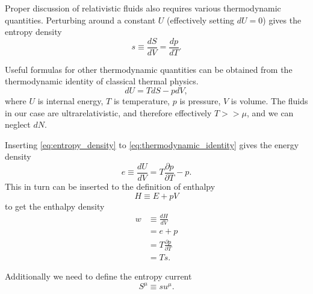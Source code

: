 Proper discussion of relativistic fluids also requires various thermodynamic quantities.
Perturbing around a constant $U$ (effectively setting $dU=0$) gives the entropy density
\cite[p. 23]{lecture_notes}
\begin{equation}
s \equiv \frac{dS}{dV} = \frac{dp}{dT}.
\label{eq:entropy_density}
\end{equation}

Useful formulas for other thermodynamic quantities can be obtained from the thermodynamic identity of classical thermal physics.
\cites[eq. 2.136]{rezzolla_relativistic_2013}[eq. 3.68]{schroeder_thermal_2000}
\begin{equation}
dU = TdS - pdV, %
\label{eq:thermodynamic_identity}
\end{equation}
where $U$ is internal energy, $T$ is temperature, $p$ is pressure, $V$ is volume.
The fluids in our case are ultrarelativistic, and therefore effectively $T >> \mu$,
and we can neglect $dN$.

Inserting \eqref{eq:entropy_density} to \eqref{eq:thermodynamic_identity} gives the energy density
\begin{equation}
e \equiv \frac{dU}{dV} = T \frac{\partial p}{\partial T} - p.
\label{eq:energy_density}
\end{equation}
This in turn can be inserted to the definition of enthalpy
\cite[eq. 1.51]{schroeder_thermal_2000}
\begin{equation}
H \equiv E + pV
\end{equation}
to get the enthalpy density
\begin{align}
w
&\equiv \frac{dH}{dV} \\
&= e+p
\label{eq:enthalpy_sum} \\
&= T \frac{\partial p}{\partial T}
\label{eq:enthalpy_pressure}\\
&= Ts.
\label{eq:enthalpy_entropy}
\end{align}
\iffalse
Additionally we need to define the specific enthalpy \cite[eq. 2.141]{rezzolla_relativistic_2013}
\begin{equation}
h = \frac{e+p}{\rho},
\label{eq:specific_enthalpy}
\end{equation}
where $\rho$ is the rest-mass density, and the entropy current
\fi
Additionally we need to define the entropy current
\cite[p. 23]{lecture_notes}
\begin{equation}
S^\mu \equiv su^\mu.
\end{equation}



